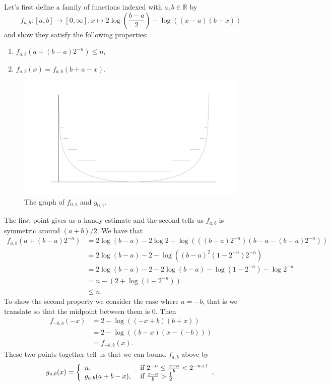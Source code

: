 \documentclass[a4paper,12pt,twoside,BCOR=10mm]{scrbook}
\theoremstyle{definition}
\theoremstyle{definition}
\theoremstyle{definition}
\begin{document}
Let's first define a family of functions indexed with $a, b \in \mathbb{R}$ by
\[
	f_{a, b}: [a, b] \rightarrow [0, \infty],
	x \mapsto 2\log \left ( \frac{b - a}{2} \right ) - \log((x - a)(b - x))
\]
and show they satisfy the following properties:
\begin{enumerate}
\item
$f_{a, b}(a + (b - a)2^{-n}) \leq n$,
\item
$f_{a, b}(x) = f_{a, b}(b + a - x)$.
\end{enumerate}
\begin{figure}[h]
\centering
\includegraphics[width=1\textwidth]{graph2}
\caption{The graph of $f_{0, 1}$ and $g_{0, 1}$.}
\end{figure}
The first point gives us a handy estimate and the second tells us $f_{a, b}$ is symmetric around $(a + b)/2$.
We have that
\begin{align*}
	f_{a, b}(a + (b - a)2^{-n})
	&= 2\log (b - a) - 2\log 2 - \log (((b - a)2^{-n})(b - a - (b - a)2^{-n}))\\
	&= 2\log (b - a) - 2 - \log ((b - a)^2(1 - 2^{-n})2^{-n})\\
	&= 2\log (b - a) - 2 - 2\log (b - a) - \log (1 - 2^{-n}) - \log 2^{-n}\\
	&= n - (2 + \log (1 - 2^{-n}))\\
	&\leq n.
\end{align*}
To show the second property we consider the case where $a = -b$, that is we translate so that the midpoint between them is $0$.
Then
\begin{align*}
f_{-b, b}(-x)
&= 2 - \log ((-x + b)(b + x))\\
&= 2 - \log ((b - x)(x - (-b)))\\
&= f_{-b, b}(x).
\end{align*}
These two points together tell us that we can bound $f_{a, b}$ above by
\[
	g_{a, b}(x) =
	\left \{
	\begin{array}{l l}
	n, & \text{ if } 2^{-n} \leq \frac{x - a}{b} < 2^{-n + 1}\\
	g_{a, b}(a + b - x) , & \text{ if } \frac{x - a}{b} > \frac{1}{2}
	\end{array},
	\right .
\]
\end{document}
